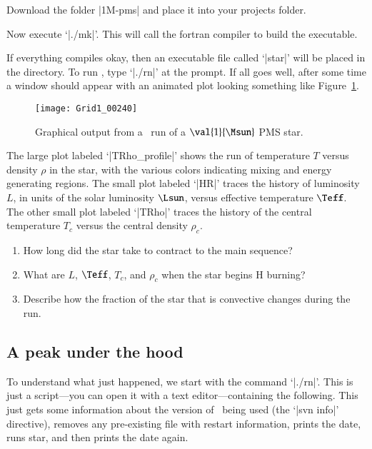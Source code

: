 Download the folder |1M-pms| and place it into your projects folder.

Now execute `|./mk|'. This will call the fortran compiler to build the executable. 

If everything compiles okay, then an executable file called `|star|' will be placed in the directory. To run \mesa, type `|./rn|' at the prompt.  If all goes well, after some time a window should appear with an animated plot looking something like Figure~\ref{f.mesa-fig}.

\begin{figure}[htbp]
\centering\texttt{[image: Grid1\_00240]}
\caption{Graphical output from a \mesa\ run of a $\val{1}{\Msun}$ PMS star. \label{f.mesa-fig}}
\end{figure}

The large plot labeled `|TRho_profile|' shows the run of temperature $T$ versus density $\rho$ in the star, with the various colors indicating mixing and energy generating regions. The small plot labeled `|HR|' traces the history of luminosity $L$, in units of the solar luminosity $\Lsun$, versus effective temperature $\Teff$. The other small plot labeled `|TRho|' traces the history of the central temperature $T_{c}$ versus the central density $\rho_{c}$.

\begin{exercisebox}
\begin{enumerate}
\item How long did the star take to contract to the main sequence?
\item What are $L$, $\Teff$, $T_{c}$, and $\rho_{c}$ when the star begins H burning?
\item Describe how the fraction of the star that is convective changes during the run.
\end{enumerate}
\end{exercisebox}

\subsection{A peak under the hood}
To understand what just happened, we start with the command `|./rn|'. This is just a script---you can open it with a text editor---containing the following.
This just gets some information about the version of \mesa\ being used (the `|svn info|' directive), removes any pre-existing file with restart information, prints the date, runs star, and then prints the date again.

